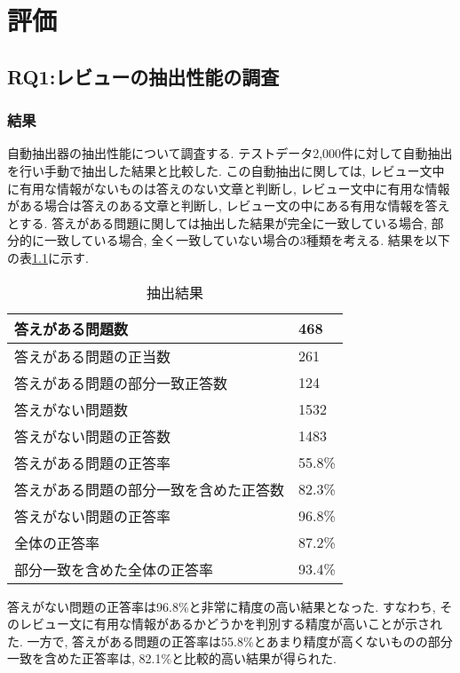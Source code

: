 \chapter{評価}
\label{chap:kekkahyouka}

\section{RQ1:レビューの抽出性能の調査}
\subsection{結果}
自動抽出器の抽出性能について調査する. テストデータ2,000件に対して自動抽出を行い手動で抽出した結果と比較した. この自動抽出に関しては, レビュー文中に有用な情報がないものは答えのない文章と判断し, レビュー文中に有用な情報がある場合は答えのある文章と判断し, レビュー文の中にある有用な情報を答えとする. 
答えがある問題に関しては抽出した結果が完全に一致している場合, 部分的に一致している場合, 全く一致していない場合の3種類を考える. 
結果を以下の表\ref{tb:qa}に示す. 

\begin{table}[htbp]
  \caption{抽出結果}
  \label{tb:qa}
  \begin{center}
  \begin{tabularx}{\linewidth}{|X|X|}
    \hline
    答えがある問題数&468\\\hline
    答えがある問題の正当数&261\\\hline
    答えがある問題の部分一致正答数&124\\\hline
    答えがない問題数&1532\\\hline
    答えがない問題の正答数&1483\\\hline
    \hline
    答えがある問題の正答率&55.8\%\\\hline
    答えがある問題の部分一致を含めた正答数&82.3\%\\\hline
    答えがない問題の正答率&96.8\%\\\hline
    \hline
    全体の正答率&87.2\%\\\hline
    部分一致を含めた全体の正答率&93.4\%\\\hline
  \end{tabularx}\end{center}
\end{table}

答えがない問題の正答率は96.8\%と非常に精度の高い結果となった. すなわち, そのレビュー文に有用な情報があるかどうかを判別する精度が高いことが示された. 
一方で, 答えがある問題の正答率は55.8\%とあまり精度が高くないものの部分一致を含めた正答率は, 82.1\%と比較的高い結果が得られた. 

